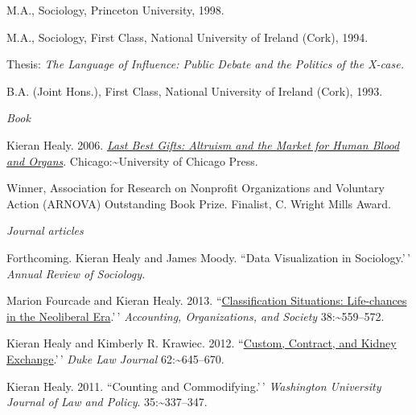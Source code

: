 \documentclass[11pt,article,oneside]{memoir}
\begin{document}
\ind M.A., Sociology, Princeton University, 1998.

\ind M.A., Sociology, First Class, National University of Ireland
(Cork), 1994.

\ind \hspace{0.35in} \footnotesize Thesis:
\emph{The Language of Influence: Public Debate and the Politics of the X-case.}
\normalsize \vspace{0.01in}

\ind B.A. (Joint Hons.), First Class, National University of Ireland
(Cork), 1993.

\bigskip

\medskip

\noindent\emph{Book \vspace{0.01in}}

\ind  Kieran Healy. 2006.
\emph{\href{http://www.lastbestgifts.com}{Last Best Gifts: Altruism and the Market for Human Blood and Organs}}.
Chicago:\textasciitilde University of Chicago Press. \vspace{0.05in}

\ind \hspace{0.35in} \footnotesize Winner, Association for Research on
Nonprofit Organizations and Voluntary Action (ARNOVA) Outstanding Book
Prize. Finalist, C. Wright Mills Award.

\vspace{-0.075in}

\normalsize

\bigskip

\noindent\emph{Journal articles \vspace{0.05in}}

\ind Forthcoming. Kieran Healy and James Moody. ``Data Visualization in
Sociology.'\,' \emph{Annual Review of Sociology.}

\ind Marion Fourcade and Kieran Healy. 2013.
``\href{http://kieranhealy.org/files/papers/classification-situations.pdf}{Classification Situations: Life-chances in the Neoliberal Era}.'\,'
\emph{Accounting, Organizations, and Society}
38:\textasciitilde559--572.

\ind Kieran Healy and Kimberly R. Krawiec. 2012.
``\href{http://kieranhealy.org/files/papers/custom-contract-kidney.pdf}{Custom, Contract, and Kidney Exchange}.'\,'
\emph{Duke Law Journal} 62:\textasciitilde645--670.

\ind Kieran Healy. 2011. ``Counting and Commodifying.'\,'
\emph{Washington University Journal of Law and Policy}.
35:\textasciitilde337--347.
\end{document}
